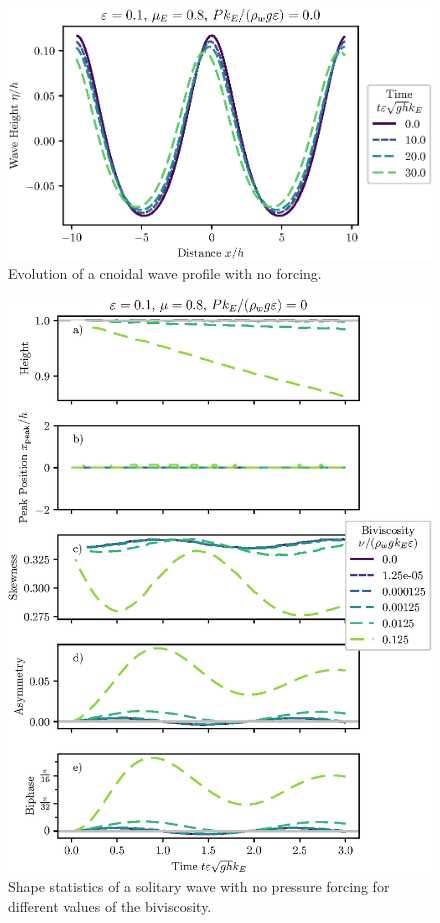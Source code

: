 \documentclass{jfm}
\begin{document}
\begin{figure}
  \centering
  \includegraphics{Long-Run-Cnoidal.eps}
  \caption{
    Evolution of a cnoidal wave profile with no forcing.
  }
\end{figure}

\begin{figure}
  \centering
  \includegraphics{Biviscosity.eps}
  \caption{
    Shape statistics of a solitary wave with no pressure forcing for
    different values of the biviscosity.
  }
\end{figure}
\end{document}
